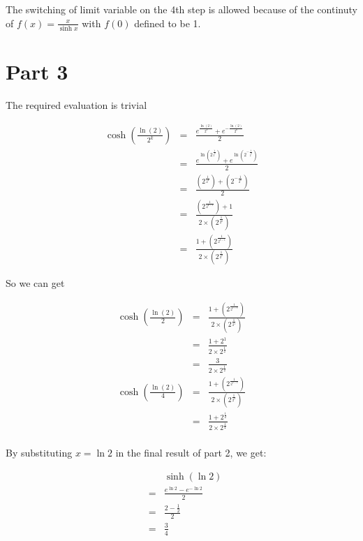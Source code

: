 \documentclass{article}
\begin{document}
The switching of limit variable on the 4th step is allowed because of the continuty of $ f(x) = \frac{x}{\sinh{x}} $ with $ f(0) $ defined to be 1.

\section*{Part 3}
The required evaluation is trivial

\begin{eqnarray*}
  \cosh\left(\frac{\ln(2)}{2^k}\right) &=& \frac{e^{\frac{\ln(2)}{2^k}} + e^{-\frac{\ln(2)}{2^k}}}{2} \\
                                       &=& \frac{e^{\ln\left(2^{\frac{1}{2^k}}\right)} + e^{\ln\left(2^{-\frac{1}{2^k}}\right)}}{2} \\
                                       &=& \frac{\left(2^{\frac{1}{2^k}}\right) + \left(2^{-\frac{1}{2^k}}\right)}{2} \\
                                       &=& \frac{\left(2^{\frac{1}{2^{k-1}}}\right) + 1}{2 \times \left(2^{\frac{1}{2^k}}\right)} \\
                                       &=& \frac{1 + \left(2^{\frac{1}{2^{k-1}}}\right)}{2 \times \left(2^{\frac{1}{2^k}}\right)} 
\end{eqnarray*}

So we can get 

\begin{eqnarray*}
  \cosh(\frac{\ln(2)}{2}) &=& \frac{1 + \left(2^{\frac{1}{2^{1-1}}}\right)}{2 \times \left(2^{\frac{1}{2^1}}\right)} \\
                          &=& \frac{1 + 2^1}{2 \times 2^{\frac{1}{2}}} \\
                          &=& \frac{3}{2 \times 2^{\frac{1}{2}}} \\
  \cosh(\frac{\ln(2)}{4}) &=& \frac{1 + \left(2^{\frac{1}{2^{2-1}}}\right)}{2 \times \left(2^{\frac{1}{2^2}}\right)} \\
                          &=& \frac{1 + 2^{\frac{1}{2}}}{2 \times 2^{\frac{1}{4}}} \\
\end{eqnarray*}

By substituting $ x = \ln 2 $ in the final result of part 2, we get:

\begin{eqnarray*}
  & & \sinh(\ln 2) \\
  &=& \frac{e^{\ln 2} - e^{-\ln 2}}{2} \\
  &=& \frac{2 - \frac{1}{2}}{2} \\
  &=& \frac{3}{4}
\end{eqnarray*}
\end{document}
